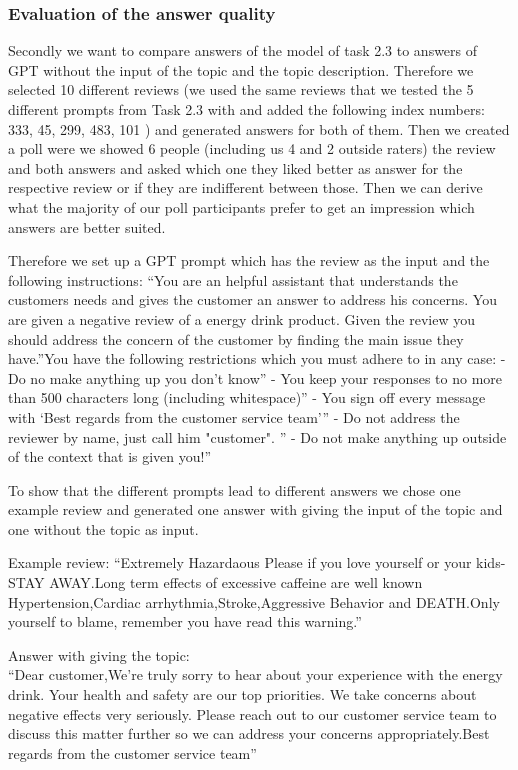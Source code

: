 \documentclass[
]{article}
\begin{document}
\hypertarget{evaluation-of-the-answer-quality}{%
\subsubsection{Evaluation of the answer
quality}\label{evaluation-of-the-answer-quality}}

Secondly we want to compare answers of the model of task 2.3 to answers
of GPT without the input of the topic and the topic description.
Therefore we selected 10 different reviews (we used the same reviews
that we tested the 5 different prompts from Task 2.3 with and added the
following index numbers: 333, 45, 299, 483, 101 ) and generated answers
for both of them. Then we created a poll were we showed 6 people
(including us 4 and 2 outside raters) the review and both answers and
asked which one they liked better as answer for the respective review or
if they are indifferent between those. Then we can derive what the
majority of our poll participants prefer to get an impression which
answers are better suited.

Therefore we set up a GPT prompt which has the review as the input and
the following instructions: ``You are an helpful assistant that
understands the customers needs and gives the customer an answer to
address his concerns. You are given a negative review of a energy drink
product. Given the review you should address the concern of the customer
by finding the main issue they have.''You have the following
restrictions which you must adhere to in any case: - Do no make anything
up you don't know'' - You keep your responses to no more than 500
characters long (including whitespace)'' - You sign off every message
with `Best regards from the customer service team''' - Do not address
the reviewer by name, just call him "customer". \n'' - Do not make
anything up outside of the context that is given you!''

To show that the different prompts lead to different answers we chose
one example review and generated one answer with giving the input of the
topic and one without the topic as input.

Example review: ``Extremely Hazardaous Please if you love yourself or
your kids-STAY AWAY.Long term effects of excessive caffeine are well
known Hypertension,Cardiac arrhythmia,Stroke,Aggressive Behavior and
DEATH.Only yourself to blame, remember you have read this warning.''

Answer with giving the topic:\\
``Dear customer,We're truly sorry to hear about your experience with the
energy drink. Your health and safety are our top priorities. We take
concerns about negative effects very seriously. Please reach out to our
customer service team to discuss this matter further so we can address
your concerns appropriately.Best regards from the customer service
team''
\end{document}
